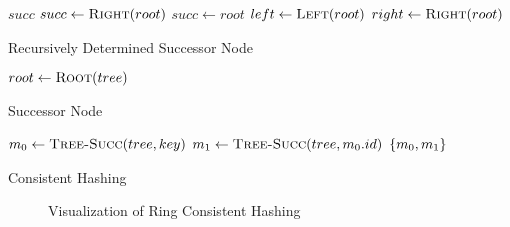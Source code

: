 \begin{algorithm}
    \begin{algorithmic}
                \State \Return $succ$
                \State $succ \gets \Call{Right}{root}$
                    \State $succ \gets root$
                    \EndWhile
                \Else
                    \EndWhile
                \EndIf
                \State $left \gets \Call{Left}{root}$
                \State \Return {}
            \Else
                \State $right \gets \Call{Right}{root}$
                \State \Return {}
            \EndIf
        \EndProcedure
    \end{algorithmic}
    \caption{Recursively Determined Successor Node}
    \label{alg:recur-succ}
\end{algorithm}
%
\begin{algorithm}
    \begin{algorithmic}
                \State \Return {}
            \Else
                \State $root \gets \Call{Root}{tree}$
                \State \Return {}
            \EndIf
        \EndProcedure
    \end{algorithmic}
    \caption{Successor Node}
    \label{alg:tree-succ}
\end{algorithm}
%
\begin{algorithm}
    \begin{algorithmic}
            \State $m_0 \gets \Call{Tree-Succ}{tree, key}$
            \State $m_1 \gets \Call{Tree-Succ}{tree, m_0.id}$
            \State \Return $\left\{m_0, m_1\right\}$
        \EndProcedure
    \end{algorithmic}
    \caption{Consistent Hashing}
    \label{alg:consistent-hashing}
\end{algorithm}
%
\begin{figure}
    \centering
    
    \caption{Visualization of Ring Consistent Hashing}
    \label{fig:ring-hash-process}
\end{figure}
%
